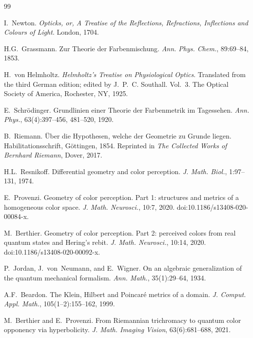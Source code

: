 \documentclass[11pt]{article}
\theoremstyle{plain}
\theoremstyle{definition}
\theoremstyle{remark}
\begin{document}

\begin{thebibliography}{99}

I.~Newton.
\newblock \emph{Opticks, or, A Treatise of the Reflections, Refractions, Inflections and Colours of Light}.
\newblock London, 1704.

H.G.~Grassmann.
\newblock Zur Theorie der Farbenmischung.
\newblock \emph{Ann. Phys. Chem.}, 89:69--84, 1853.

H.~von Helmholtz.
\newblock \emph{Helmholtz's Treatise on Physiological Optics}.
\newblock Translated from the third German edition; edited by J.~P.~C. Southall.
\newblock Vol.~3. The Optical Society of America, Rochester, NY, 1925.

E.~Schr\"odinger.
\newblock Grundlinien einer Theorie der Farbenmetrik im Tagessehen.
\newblock \emph{Ann. Phys.}, 63(4):397--456, 481--520, 1920.

B.~Riemann.
\newblock \"Uber die Hypothesen, welche der Geometrie zu Grunde liegen.
\newblock Habilitationsschrift, G\"ottingen, 1854.
\newblock Reprinted in \emph{The Collected Works of Bernhard Riemann}, Dover, 2017.

H.L.~Resnikoff. Differential geometry and color perception. \emph{J. Math. Biol.}, 1:97--131, 1974.

E.~Provenzi.
\newblock Geometry of color perception. Part 1: structures and metrics of a homogeneous color space.
\newblock \emph{J. Math. Neurosci.}, 10:7, 2020.
\newblock doi:10.1186/s13408-020-00084-x.

M.~Berthier.
\newblock Geometry of color perception. Part 2: perceived colors from real quantum states and Hering's rebit.
\newblock \emph{J. Math. Neurosci.}, 10:14, 2020.
\newblock doi:10.1186/s13408-020-00092-x.

P.~Jordan, J.~von~Neumann, and E.~Wigner.
\newblock On an algebraic generalization of the quantum mechanical formalism.
\newblock \emph{Ann. Math.}, 35(1):29--64, 1934.

A.F.~Beardon.
\newblock The {K}lein, {H}ilbert and {P}oincar\'e metrics of a domain.
\newblock \emph{J. Comput. Appl. Math.}, 105(1--2):155--162, 1999.

M.~Berthier and E.~Provenzi.
\newblock From {R}iemannian trichromacy to quantum color opponency via hyperbolicity.
\newblock \emph{J. Math. Imaging Vision}, 63(6):681--688, 2021.


\end{thebibliography}
\end{document}
